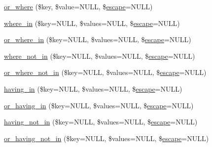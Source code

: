 \begin{DoxyCompactItemize}
\item 
\mbox{\hyperlink{class_c_i___d_b__query__builder_a8d25e93a09f60fbe77541d0faef29bf0}{or\+\_\+where}} (\$key, \$value=N\+U\+LL, \$\mbox{\hyperlink{class_c_i___d_b__driver_ac8f37ca5703d4558c732e692194f8cd6}{escape}}=N\+U\+LL)
\item 
\mbox{\hyperlink{class_c_i___d_b__query__builder_ad74b2c2b21b33f4aa54229a323b7ba59}{where\+\_\+in}} (\$key=N\+U\+LL, \$values=N\+U\+LL, \$\mbox{\hyperlink{class_c_i___d_b__driver_ac8f37ca5703d4558c732e692194f8cd6}{escape}}=N\+U\+LL)
\item 
\mbox{\hyperlink{class_c_i___d_b__query__builder_a9c3f8f4d2f9b9b033a27a2d868278662}{or\+\_\+where\+\_\+in}} (\$key=N\+U\+LL, \$values=N\+U\+LL, \$\mbox{\hyperlink{class_c_i___d_b__driver_ac8f37ca5703d4558c732e692194f8cd6}{escape}}=N\+U\+LL)
\item 
\mbox{\hyperlink{class_c_i___d_b__query__builder_ab9f1b5e0622e0392796c5c9f4cca705a}{where\+\_\+not\+\_\+in}} (\$key=N\+U\+LL, \$values=N\+U\+LL, \$\mbox{\hyperlink{class_c_i___d_b__driver_ac8f37ca5703d4558c732e692194f8cd6}{escape}}=N\+U\+LL)
\item 
\mbox{\hyperlink{class_c_i___d_b__query__builder_ace5f568aace8a66636091e220fcd03c3}{or\+\_\+where\+\_\+not\+\_\+in}} (\$key=N\+U\+LL, \$values=N\+U\+LL, \$\mbox{\hyperlink{class_c_i___d_b__driver_ac8f37ca5703d4558c732e692194f8cd6}{escape}}=N\+U\+LL)
\item 
\mbox{\hyperlink{class_c_i___d_b__query__builder_a7870471a55d8dbe5c5cae8404a9d7f64}{having\+\_\+in}} (\$key=N\+U\+LL, \$values=N\+U\+LL, \$\mbox{\hyperlink{class_c_i___d_b__driver_ac8f37ca5703d4558c732e692194f8cd6}{escape}}=N\+U\+LL)
\item 
\mbox{\hyperlink{class_c_i___d_b__query__builder_a3e0bb6fbdfd591627862687a2b90a069}{or\+\_\+having\+\_\+in}} (\$key=N\+U\+LL, \$values=N\+U\+LL, \$\mbox{\hyperlink{class_c_i___d_b__driver_ac8f37ca5703d4558c732e692194f8cd6}{escape}}=N\+U\+LL)
\item 
\mbox{\hyperlink{class_c_i___d_b__query__builder_a27f295d01923fa1323678e102aa3547b}{having\+\_\+not\+\_\+in}} (\$key=N\+U\+LL, \$values=N\+U\+LL, \$\mbox{\hyperlink{class_c_i___d_b__driver_ac8f37ca5703d4558c732e692194f8cd6}{escape}}=N\+U\+LL)
\item 
\mbox{\hyperlink{class_c_i___d_b__query__builder_a3e2eb1ba2c6d39b7b49f055c5c19c261}{or\+\_\+having\+\_\+not\+\_\+in}} (\$key=N\+U\+LL, \$values=N\+U\+LL, \$\mbox{\hyperlink{class_c_i___d_b__driver_ac8f37ca5703d4558c732e692194f8cd6}{escape}}=N\+U\+LL)
\item 

\end{DoxyCompactItemize}
